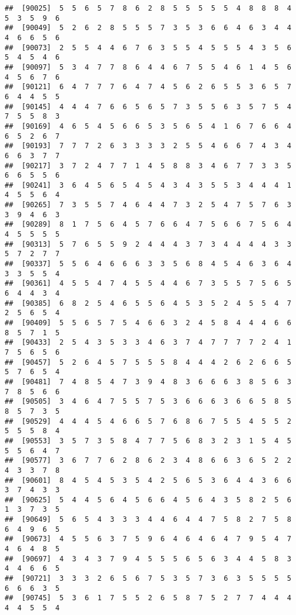 \documentclass[
]{book}
\begin{document}
\begin{verbatim}
##  [90025]  5  5  6  5  7  8  6  2  8  5  5  5  5  5  4  8  8  8  4  5  3  5  9  6
##  [90049]  5  2  6  2  8  5  5  5  7  3  5  3  6  6  4  6  3  4  4  4  6  6  5  6
##  [90073]  2  5  5  4  4  6  7  6  3  5  5  4  5  5  5  4  3  5  6  5  4  5  4  6
##  [90097]  5  3  4  7  7  8  6  4  4  6  7  5  5  4  6  1  4  5  6  4  5  6  7  6
##  [90121]  6  4  7  7  7  6  4  7  4  5  6  2  6  5  5  3  6  5  7  6  4  4  5  5
##  [90145]  4  4  4  7  6  6  5  6  5  7  3  5  5  6  3  5  7  5  4  7  5  5  8  3
##  [90169]  4  6  5  4  5  6  6  5  3  5  6  5  4  1  6  7  6  6  4  6  5  2  6  7
##  [90193]  7  7  7  2  6  3  3  3  3  2  5  5  4  6  6  7  4  3  4  6  6  3  7  7
##  [90217]  3  7  2  4  7  7  1  4  5  8  8  3  4  6  7  7  3  3  5  6  6  5  5  6
##  [90241]  3  6  4  5  6  5  4  5  4  3  4  3  5  5  3  4  4  4  1  4  5  5  6  4
##  [90265]  7  3  5  5  7  4  6  4  4  7  3  2  5  4  7  5  7  6  3  3  9  4  6  3
##  [90289]  8  1  7  5  6  4  5  7  6  6  4  7  5  6  6  7  5  6  4  4  5  5  5  5
##  [90313]  5  7  6  5  5  9  2  4  4  4  3  7  3  4  4  4  4  3  3  5  7  2  7  7
##  [90337]  5  5  6  4  6  6  6  3  3  5  6  8  4  5  4  6  3  6  4  3  3  5  5  4
##  [90361]  4  5  5  4  7  4  5  5  4  4  6  7  3  5  5  7  5  6  5  6  4  4  3  4
##  [90385]  6  8  2  5  4  6  5  5  6  4  5  3  5  2  4  5  5  4  7  2  5  6  5  4
##  [90409]  5  5  6  5  7  5  4  6  6  3  2  4  5  8  4  4  4  6  6  8  5  7  1  5
##  [90433]  2  5  4  3  5  3  3  4  6  3  7  4  7  7  7  7  2  4  1  7  5  6  5  6
##  [90457]  5  2  6  4  5  7  5  5  5  8  4  4  4  2  6  2  6  6  5  5  7  6  5  4
##  [90481]  7  4  8  5  4  7  3  9  4  8  3  6  6  6  3  8  5  6  3  7  8  5  6  6
##  [90505]  3  4  6  4  7  5  5  7  5  3  6  6  6  3  6  6  5  8  5  8  5  7  3  5
##  [90529]  4  4  4  5  4  6  6  5  7  6  8  6  7  5  5  4  5  5  2  5  5  5  8  4
##  [90553]  3  5  7  3  5  8  4  7  7  5  6  8  3  2  3  1  5  4  5  5  5  6  4  7
##  [90577]  3  6  7  7  6  2  8  6  2  3  4  8  6  6  3  6  5  2  2  4  3  3  7  8
##  [90601]  8  4  5  4  5  3  5  4  2  5  6  5  3  6  4  4  3  6  6  3  7  4  3  3
##  [90625]  5  4  4  5  6  4  5  6  6  4  5  6  4  3  5  8  2  5  6  1  3  7  3  5
##  [90649]  5  6  5  4  3  3  3  4  4  6  4  4  7  5  8  2  7  5  8  6  4  9  6  5
##  [90673]  4  5  5  6  3  7  5  9  6  4  6  4  6  4  7  9  5  4  7  4  6  4  8  5
##  [90697]  4  3  4  3  7  9  4  5  5  5  6  5  6  3  4  4  5  8  3  4  4  6  6  5
##  [90721]  3  3  3  2  6  5  6  7  5  3  5  7  3  6  3  5  5  5  5  6  6  6  3  5
##  [90745]  5  3  6  1  7  5  5  2  6  5  8  7  5  2  7  7  4  4  4  4  4  5  5  4

\end{verbatim}
\end{document}
